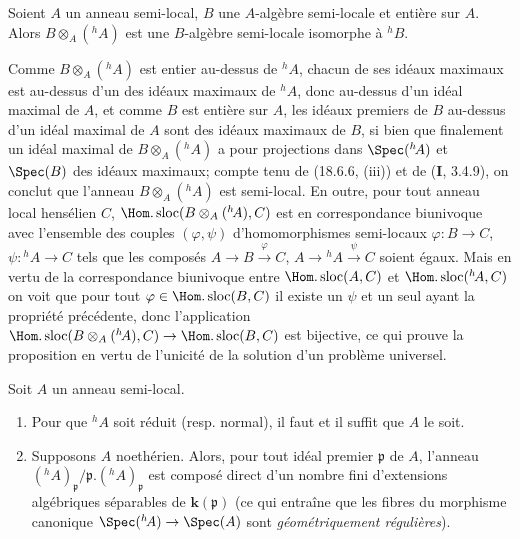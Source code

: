 \begin{proposition}[18.6.8]
\label{IV.18.6.8}
Soient $A$ un anneau semi-local, $B$ une $A$-algèbre semi-locale et entière sur $A$. Alors $B\otimes_A({}^h\!A)$ est une $B$-algèbre semi-locale isomorphe à ${}^h\!B$.
\end{proposition}

Comme $B\otimes_A({}^h\!A)$ est entier au-dessus de ${}^h\!A$, chacun de ses idéaux maximaux est au-dessus d'un des idéaux maximaux de ${}^h\!A$, donc au-dessus d'un idéal maximal de $A$, et comme $B$ est entière sur $A$, les idéaux premiers de $B$ au-dessus d'un idéal maximal de $A$ sont des idéaux maximaux de $B$, si bien que finalement un idéal maximal de $B\otimes_A({}^h\!A)$ a pour projections dans $\Spec({}^h\!A)$ et $\Spec(B)$ des idéaux maximaux; compte tenu de (18.6.6, (iii)) et de (\textbf{I}, 3.4.9), on conclut que l'anneau $B\otimes_A({}^h\!A)$ est semi-local. En outre, pour tout anneau local hensélien $C$, $\Hom.\operatorname{sloc}(B\otimes_A({}^h\!A),C)$ est en correspondance biunivoque avec l'ensemble des couples $(\varphi,\psi)$ d'homomorphismes semi-locaux $\varphi:B\to C$, $\psi:{}^h\!A\to C$ tels que les composés $A\to B\xrightarrow{\varphi}C$, $A\to{}^h\!A\xrightarrow{\psi}C$ soient égaux. Mais en vertu de la correspondance biunivoque entre $\Hom.\operatorname{sloc}(A,C)$ et $\Hom.\operatorname{sloc}({}^h\!A,C)$ on voit que pour tout $\varphi\in\Hom.\operatorname{sloc}(B,C)$ il existe un $\psi$ et un seul ayant la propriété précédente, donc l'application $\Hom.\operatorname{sloc}(B\otimes_A({}^h\!A),C)\to\Hom.\operatorname{sloc}(B,C)$ est bijective, ce qui prouve la proposition en vertu de l'unicité de la solution d'un problème universel.

\begin{theorem}[18.6.9]
\label{IV.18.6.9}
Soit $A$ un anneau semi-local.
\begin{enumerate}
  \item[\textup{(i)}] Pour que ${}^h\!A$ soit réduit \textup{(resp.} normal\textup{)}, il faut et il suffit que $A$ le soit.
  \item[\textup{(ii)}] Supposons $A$ noethérien. Alors, pour tout idéal premier $\mathfrak p$ de $A$, l'anneau $({}^h\!A)_{\mathfrak p}/\mathfrak p.({}^h\!A)_{\mathfrak p}$ est composé direct d'un nombre fini d'extensions algébriques séparables de $\boldsymbol{k}(\mathfrak p)$ \textup{(ce qui entraîne que les fibres du morphisme canonique $\Spec({}^h\!A)\to\Spec(A)$ sont \emph{géométriquement régulières})}.
\end{enumerate}
\end{theorem}

